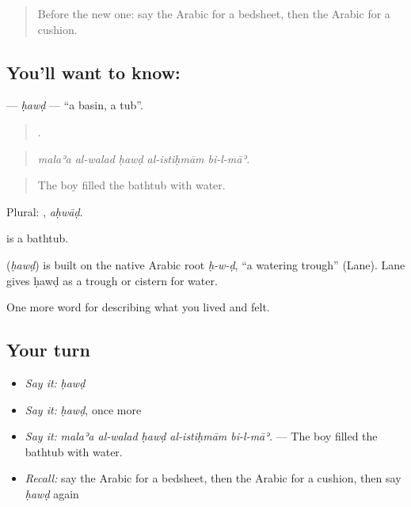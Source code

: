 \label{lesson:AR-C551-hawd}



\begin{quote}
Before the new one: say the Arabic for a bedsheet, then the Arabic for a cushion.
\end{quote}

\subsection*{You'll want to know: }
\textbf{} — \emph{ḥawḍ} — \textquotedblleft{}a basin, a tub\textquotedblright{}.

\begin{quote}
    .
\end{quote}

\begin{quote}
\emph{malaʾa al-walad ḥawḍ al-istiḥmām bi-l-māʾ.}
\end{quote}

\begin{quote}
The boy filled the bathtub with water.
\end{quote}

Plural: , \emph{aḥwāḍ}.

  is a bathtub.

\begin{cousinweb}
\textbf{} (\emph{ḥawḍ}) is built on the native Arabic root \emph{ḥ-w-ḍ}, \textquotedblleft{}a watering trough\textquotedblright{} (Lane). Lane gives ḥawḍ as a trough or cistern for water.
\end{cousinweb}

\begin{grammarlens}[title={What you've built}]
One more word for describing what you lived and felt.
\end{grammarlens}

\subsection*{Your turn}
\begin{itemize}
\raggedright
  \item \emph{Say it:} \emph{ḥawḍ}
  \item \emph{Say it:} \emph{ḥawḍ}, once more
  \item \emph{Say it:} \emph{malaʾa al-walad ḥawḍ al-istiḥmām bi-l-māʾ.} — The boy filled the bathtub with water.
  \item \emph{Recall:} say the Arabic for a bedsheet, then the Arabic for a cushion, then say \emph{ḥawḍ} again
\end{itemize}

